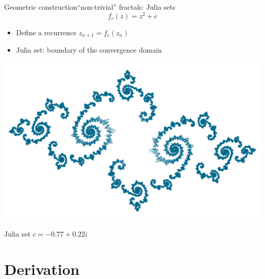 \documentclass[xcolor=x11names,compress,professionalfonts]{beamer}
\renewcommand{\(}{\begin{columns}}
\renewcommand{\)}{\end{columns}}
\newcommand{\<}[1]{\begin{column}{#1}}
\renewcommand{\>}{\end{column}}
\begin{document}
\begin{frame}{Geometric construction}{``non-trivial'' fractals: Julia sets}
	\[ f_c(z) = z^2 + c \]
\begin{itemize}
	\item Define a recurrence $z_{n+1} = f_c(z_n)$
	\item Julia set: boundary of the convergence domain
\end{itemize}

\centering
\includegraphics[scale=0.2]{julia.png}

\scriptsize
    Julia set $c = -0.77 + 0.22 i$

\end{frame}

\section{Derivation}
\end{document}
